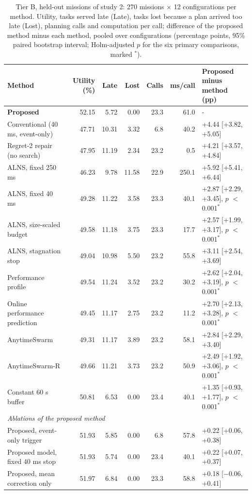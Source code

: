 \begin{table}[t]
\caption{Tier B, held-out missions of study 2: 270 missions $\times$ 12 configurations per method. Utility, tasks served late (Late), tasks lost because a plan arrived too late (Lost), planning calls and computation per call; difference of the proposed method minus each method, pooled over configurations (percentage points, 95\% paired bootstrap interval; Holm-adjusted $p$ for the six primary comparisons, marked $^{\ast}$).}\label{tab:s2main}
\centering\small
\setlength{\tabcolsep}{3pt}
\begin{tabular}{lrrrrrl}
\toprule
Method & Utility (\%) & Late & Lost & Calls & ms/call & Proposed minus method (pp) \\
\midrule
\textbf{Proposed} & 52.15 & 5.72 & 0.00 & 23.3 & 61.0 & - \\
Conventional (40 ms, event-only) & 47.71 & 10.31 & 3.32 & 6.8 & 40.2 & +4.44 [+3.82, +5.05] \\
Regret-2 repair (no search) & 47.95 & 11.19 & 2.34 & 23.2 & 0.5 & +4.21 [+3.57, +4.84] \\
ALNS, fixed 250 ms~\cite{ropke2006adaptive} & 46.23 & 9.78 & 11.58 & 22.9 & 250.1 & +5.92 [+5.41, +6.44] \\
ALNS, fixed 40 ms~\cite{ropke2006adaptive} & 49.28 & 11.22 & 3.58 & 23.3 & 40.1 & +2.87 [+2.29, +3.45], $p$ $<$0.001$^{\ast}$ \\
ALNS, size-scaled budget & 49.58 & 11.18 & 3.75 & 23.3 & 17.7 & +2.57 [+1.99, +3.17], $p$ $<$0.001$^{\ast}$ \\
ALNS, stagnation stop & 49.04 & 10.98 & 5.50 & 23.2 & 55.8 & +3.11 [+2.54, +3.69] \\
Performance profile~\cite{boddy1994deliberation,zilberstein1996using} & 49.54 & 11.24 & 3.52 & 23.2 & 30.2 & +2.62 [+2.04, +3.19], $p$ $<$0.001$^{\ast}$ \\
Online performance prediction~\cite{svegliato2018meta} & 49.45 & 11.17 & 2.75 & 23.2 & 11.2 & +2.70 [+2.13, +3.28], $p$ $<$0.001$^{\ast}$ \\
AnytimeSwarm & 49.31 & 11.17 & 3.89 & 23.2 & 58.1 & +2.84 [+2.29, +3.40] \\
AnytimeSwarm-R & 49.66 & 11.21 & 3.73 & 23.2 & 50.9 & +2.49 [+1.92, +3.06], $p$ $<$0.001$^{\ast}$ \\
Constant 60 s buffer~\cite{agra2013robust} & 50.81 & 6.53 & 0.00 & 23.4 & 40.1 & +1.35 [+0.93, +1.77], $p$ $<$0.001$^{\ast}$ \\
\midrule
\multicolumn{7}{l}{\textit{Ablations of the proposed method}} \\
Proposed, event-only trigger & 51.93 & 5.85 & 0.00 & 6.8 & 57.8 & +0.22 [+0.06, +0.38] \\
Proposed model, fixed 40 ms stop & 51.93 & 5.74 & 0.00 & 23.4 & 40.1 & +0.22 [+0.07, +0.37] \\
Proposed, mean correction only & 51.97 & 6.84 & 0.00 & 23.3 & 58.8 & +0.18 [$-$0.06, +0.41] \\
\bottomrule
\end{tabular}
\end{table}
